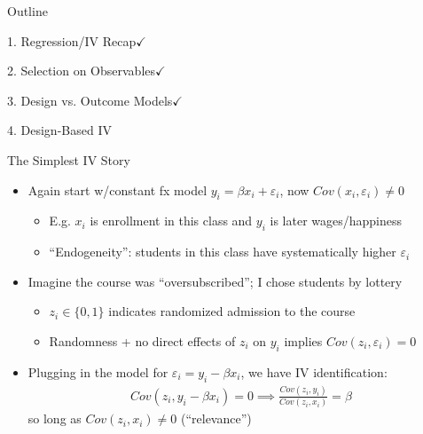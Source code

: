 \documentclass[11pt,english]{beamer}
\begin{document}
\begin{frame}{Outline}

\textcolor{red!75!green!50!blue!25!gray}{1. Regression/IV Recap}$\checkmark$
\vspace{0.8cm}

\textcolor{red!75!green!50!blue!25!gray}{2. Selection on Observables}$\checkmark$
\vspace{0.8cm}

\textcolor{red!75!green!50!blue!25!gray}{3. Design vs. Outcome Models}$\checkmark$
\vspace{0.8cm}

4. Design-Based IV

\end{frame}

\begin{frame}{The Simplest IV Story}

\begin{itemize}
\item Again start w/constant fx model $y_{i}=\beta x_i+\varepsilon_i$, now $Cov(x_i,\varepsilon_i)\neq 0$\smallskip
\begin{itemize}
\item E.g. $x_i$ is enrollment in this class  and $y_i$ is later wages/happiness\smallskip
\item ``Endogeneity'': students in this class have systematically higher $\varepsilon_i$
\end{itemize}\bigskip\pause{}

\item Imagine the course was ``oversubscribed''; I chose students by lottery\smallskip
\begin{itemize}
\item $z_i\in\{0,1\}$ indicates randomized admission to the course\smallskip
\item Randomness + no direct effects of $z_i$ on $y_i$ implies $Cov(z_i,\varepsilon_i)=0$
\end{itemize}\bigskip\pause{}
\item Plugging in the model for $\varepsilon_i=y_i-\beta x_i$, we have IV identification:
\begin{align*}
Cov(z_i,y_i-\beta x_i)=0\implies \frac{Cov(z_i,y_i)}{Cov(z_i,x_i)}=\beta
\end{align*}
so long as $Cov(z_i,x_i)\neq 0$ (``relevance'')
\end{itemize}

\end{frame}
\end{document}
